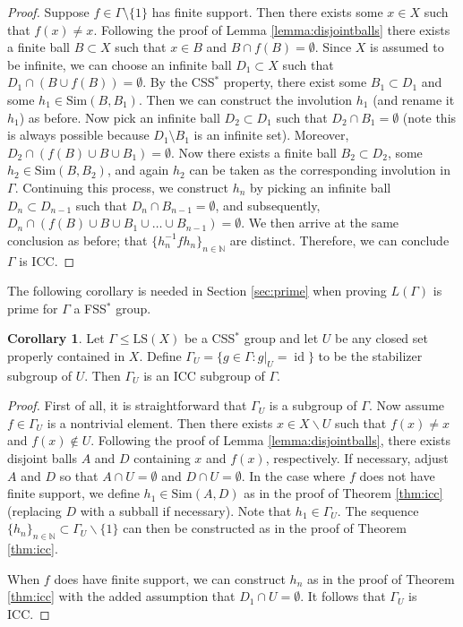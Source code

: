 \documentclass[12pt]{amsart}
\numberwithin{equation}{subsection}
\theoremstyle{definition}
\newtheorem{corollary}[theorem]{Corollary}
\theoremstyle{definition}
\theoremstyle{remark}
\begin{document}
\begin{proof}
Suppose $f \in \Gamma \setminus \{1\}$ has finite support. Then there exists some $x \in X$ such that $f(x) \neq x$. Following the proof of Lemma \ref{lemma:disjointballs} there exists a finite ball $B \subset X$ such that $x \in B$ and $B \cap f(B) = \emptyset$. Since $X$ is assumed to be infinite, we can choose an infinite ball $D_1 \subset X$ such that $D_1 \cap (B \cup f(B)) = \emptyset$. By the CSS$^*$ property, there exist some $B_1 \subset D_1$ and some $h_1 \in \text{Sim}(B, B_1)$. Then we can construct the involution $h_1$ (and rename it $h_1$) as before. Now pick an infinite ball $D_2 \subset D_1$ such that $D_2 \cap B_1 = \emptyset$ (note this is always possible because $D_1 \setminus B_1$ is an infinite set). Moreover, $D_2 \cap (f(B) \cup B \cup B_1) = \emptyset$. Now there exists a finite ball $B_2 \subset D_2$, some $h_2 \in \text{Sim}(B, B_2)$, and again $h_2$ can be taken as the corresponding involution in $\Gamma$. Continuing this process, we construct $h_n$ by picking an infinite ball $D_n \subset D_{n-1}$ such that $D_n \cap B_{n-1} = \emptyset$, and subsequently, $D_n \cap (f(B) \cup B \cup B_1 \cup \dots \cup B_{n-1}) = \emptyset$. We then arrive at the same conclusion as before; that $\{h_n^{-1} f h_n\}_{n \in \mathbb{N}}$ are distinct. Therefore, we can conclude $\Gamma$ is ICC.
\end{proof}

The following corollary is needed in Section \ref{sec:prime} when proving $L(\Gamma)$ is prime for $\Gamma$ a FSS$^*$ group.

\begin{corollary}\label{cor:iccsubgroup}
   Let $\Gamma \leq \text{LS}(X)$ be a CSS$^*$ group and let $U$ be any closed set properly contained in $X$. Define $\Gamma_U = \{ g \in \Gamma : g\vert_U = \operatorname{id}\}$ to be the stabilizer subgroup of $U$. Then $\Gamma_U$ is an ICC subgroup of $\Gamma$.
\end{corollary}

\begin{proof}
    First of all, it is straightforward that $\Gamma_U$ is a subgroup of $\Gamma$. Now assume $f \in \Gamma_U$ is a nontrivial element. Then there exists $x \in X \backslash U$ such that $f(x) \neq x$ and $f(x) \not \in U$. Following the proof of Lemma \ref{lemma:disjointballs}, there exists disjoint balls $A$ and $D$ containing $x$ and $f(x)$, respectively. If necessary, adjust $A$ and $D$ so that $A \cap U = \emptyset$ and $D \cap U = \emptyset$. In the case where $f$ does not have finite support, we define $h_1 \in \text{Sim}(A,D)$ as in the proof of Theorem \ref{thm:icc} (replacing $D$ with a subball if necessary). Note that $h_1 \in \Gamma_U$. The sequence $\{h_n\}_{n \in \mathbb{N}} \subset \Gamma_U \backslash \{1\}$ can then be constructed as in the proof of Theorem \ref{thm:icc}.
    
    When $f$ does have finite support, we can construct $h_n$ as in the proof of Theorem \ref{thm:icc} with the added assumption that $D_1 \cap U = \emptyset$. It follows that $\Gamma_U$ is ICC.
\end{proof}
\end{document}
